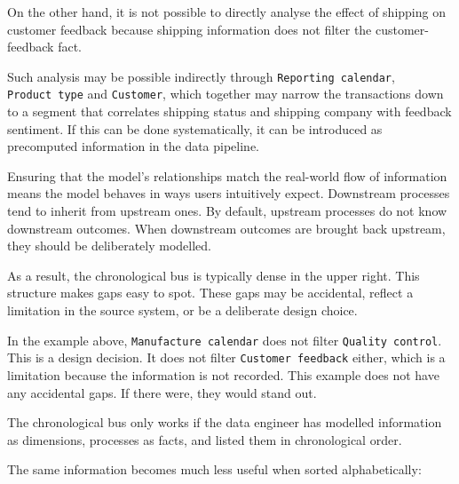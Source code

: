 \documentclass[10pt,openany,10pt]{book}
\begin{document}
On the other hand, it is not possible to directly analyse the effect of
shipping on customer feedback because shipping information does not
filter the customer-feedback fact.

Such analysis may be possible indirectly through
\texttt{\textquotesingle{}Reporting\ calendar\textquotesingle{}},
\texttt{\textquotesingle{}Product\ type\textquotesingle{}} and
\texttt{\textquotesingle{}Customer\textquotesingle{}}, which together
may narrow the transactions down to a segment that correlates shipping
status and shipping company with feedback sentiment. If this can be done
systematically, it can be introduced as precomputed information in the
data pipeline.

Ensuring that the model's relationships match the real-world flow of
information means the model behaves in ways users intuitively expect.
Downstream processes tend to inherit from upstream ones. By default,
upstream processes do not know downstream outcomes. When downstream
outcomes are brought back upstream, they should be deliberately
modelled.

As a result, the chronological bus is typically dense in the upper
right. This structure makes gaps easy to spot. These gaps may be
accidental, reflect a limitation in the source system, or be a
deliberate design choice.

In the example above,
\texttt{\textquotesingle{}Manufacture\ calendar\textquotesingle{}} does
not filter
\texttt{\textquotesingle{}Quality\ control\textquotesingle{}}. This is a
design decision. It does not filter
\texttt{\textquotesingle{}Customer\ feedback\textquotesingle{}} either,
which is a limitation because the information is not recorded. This
example does not have any accidental gaps. If there were, they would
stand out.

The chronological bus only works if the data engineer has modelled
information as dimensions, processes as facts, and listed them in
chronological order.

The same information becomes much less useful when sorted
alphabetically:
\end{document}
